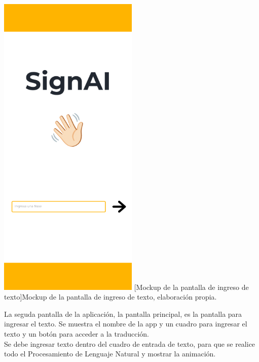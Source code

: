 \begin{center}
    \includegraphics[width=0.5\textwidth]{Images/Cap 3/Pantalla2.png}
    [Mockup de la pantalla de ingreso de texto]{Mockup de la pantalla de ingreso de texto, elaboración propia.}
\end{center}
 
La seguda pantalla de la aplicación, la pantalla principal, es la pantalla para ingresar el texto. Se muestra el nombre de la app y  un cuadro para ingresar el texto y un botón para acceder a la traducción.\\

Se debe ingresar texto dentro del cuadro de entrada de texto, para que se realice todo el Procesamiento de Lenguaje Natural y mostrar la animación.

